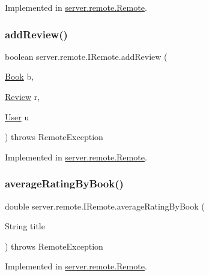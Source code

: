 Implemented in \hyperlink{classserver_1_1remote_1_1_remote_a496fcecd259c1b527ffba62fc452afee}{server.\+remote.\+Remote}.

\mbox{\label{interfaceserver_1_1remote_1_1_i_remote_ab24486281e8c228ee82a48a5ca70297b}} 
\subsubsection{\texorpdfstring{add\+Review()}{addReview()}}
{\footnotesize\ttfamily boolean server.\+remote.\+I\+Remote.\+add\+Review (\begin{DoxyParamCaption}\item[{\hyperlink{classserver_1_1data_1_1_book}{Book}}]{b,  }\item[{\hyperlink{classserver_1_1data_1_1_review}{Review}}]{r,  }\item[{\hyperlink{classserver_1_1data_1_1_user}{User}}]{u }\end{DoxyParamCaption}) throws Remote\+Exception}



Implemented in \hyperlink{classserver_1_1remote_1_1_remote_af94163cf6d5c40cfc880eb517d56aa48}{server.\+remote.\+Remote}.

\mbox{\label{interfaceserver_1_1remote_1_1_i_remote_a4a53942c94debc835f1817b2753722de}} 
\subsubsection{\texorpdfstring{average\+Rating\+By\+Book()}{averageRatingByBook()}}
{\footnotesize\ttfamily double server.\+remote.\+I\+Remote.\+average\+Rating\+By\+Book (\begin{DoxyParamCaption}\item[{String}]{title }\end{DoxyParamCaption}) throws Remote\+Exception}



Implemented in \hyperlink{classserver_1_1remote_1_1_remote_afd253ddc199a34a1e05317878f957cc9}{server.\+remote.\+Remote}.

